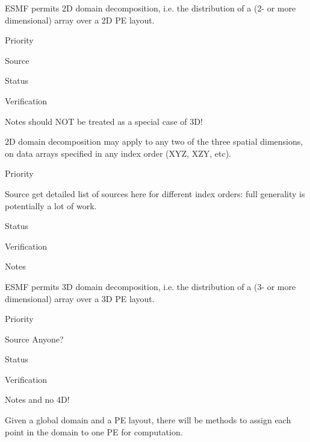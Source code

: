 ESMF permits 2D domain decomposition, i.e. the distribution of a
(2- or more dimensional) array over a 2D PE layout.

\begin{reqlist}
\item[Priority]
\item[Source]
\item[Status]
\item[Verification]
\item[Notes] should NOT be treated as a special case of 3D!
\end{reqlist}


2D domain decomposition may apply to any two of the three spatial
dimensions, on data arrays specified in any index order (XYZ, XZY,
etc).

\begin{reqlist}
\item[Priority]
\item[Source] get detailed list of sources here for different index
  orders: full generality is potentially a lot of work.
\item[Status]
\item[Verification]
\item[Notes]
\end{reqlist}


ESMF permits 3D domain decomposition, i.e. the distribution of a
(3- or more dimensional) array over a 3D PE layout.

\begin{reqlist}
\item[Priority]
\item[Source] Anyone?
\item[Status]
\item[Verification]
\item[Notes] and no 4D!
\end{reqlist}


Given a global domain and a PE layout, there will be methods to assign
each point in the domain to one PE for computation. 


